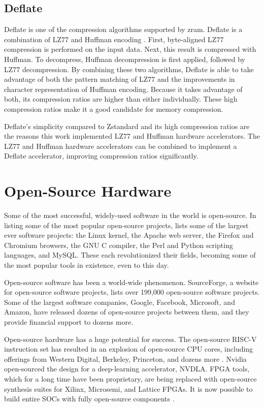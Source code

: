 \documentclass[doublespace,nopageskip]{VTthesis}
\begin{document}
\subsection{Deflate}\label{ss:deflate}
Deflate is one of the compression algorithms supported by zram. Deflate is a combination of LZ77 and Huffman encoding \cite{deflate}. First, byte-aligned LZ77 compression is performed on the input data. Next, this result is compressed with Huffman. To decompress, Huffman decompression is first applied, followed by LZ77 decompression. By combining these two algorithms, Deflate is able to take advantage of both the pattern matching of LZ77 and the improvements in character representation of Huffman encoding. Because it takes advantage of both, its compression ratios are higher than either individually. These high compression ratios make it a good candidate for memory compression.

Deflate's simplicity compared to Zstandard and its high compression ratios are the reasons this work implemented LZ77 and Huffman hardware accelerators. The LZ77 and Huffman hardware accelerators can be combined to implement a Deflate accelerator, improving compression ratios significantly.

\section{Open-Source Hardware}\label{se:open-source_motivation}
Some of the most successful, widely-used software in the world is open-source. In listing some of the most popular open-source projects, \cite{oss2.0} lists some of the largest ever software projects: the Linux kernel, the Apache web server, the Firefox and Chromium browsers, the GNU C compiler, the Perl and Python scripting languages, and MySQL. These each revolutionized their fields, becoming some of the most popular tools in existence, even to this day.

Open-source software has been a world-wide phenomenon. SourceForge, a website for open-source software projects, lists over 199,000 open-source software projects. Some of the largest software companies, Google, Facebook, Microsoft, and Amazon, have released dozens of open-source projects between them, and they provide financial support to dozens more.

Open-source hardware has a huge potential for success. The open-source RISC-V instruction set has resulted in an explosion of open-source CPU cores, including offerings from Western Digital, Berkeley, Princeton, and dozens more \cite{boom, blackparrot, openpiton}. Nvidia open-sourced the design for a deep-learning accelerator, NVDLA. FPGA tools, which for a long time have been proprietary, are being replaced with open-source synthesis suites for Xilinx, Microsemi, and Lattice FPGAs. It is now possible to build entire SOCs with fully open-source components \cite{litex}.
\end{document}
